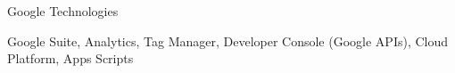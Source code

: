 \begin{cventries}
	\zcventry
	{Google Technologies} %
	{
		\begin{cvitems} %
			\item {Google Suite, Analytics, Tag Manager, Developer Console (Google APIs), Cloud Platform, Apps Scripts}
		\end{cvitems}
	}
	

	
\end{cventries}